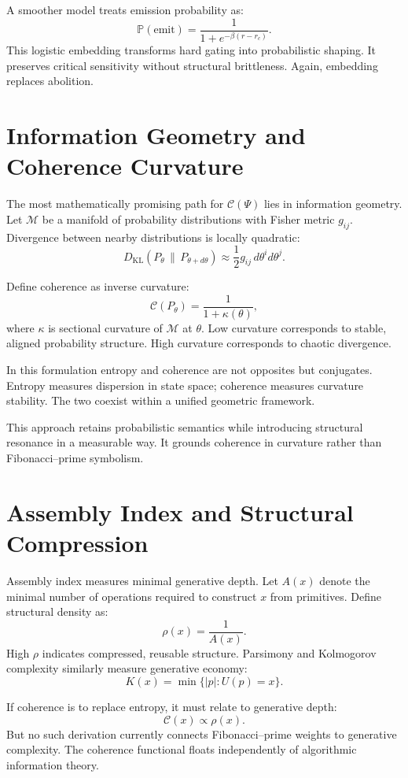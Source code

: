 \documentclass[12pt]{article}
\begin{document}
A smoother model treats emission probability as:
\[
  \mathbb{P}(\text{emit}) = \frac{1}{1 + e^{-\beta(r - r_c)}}.
\]
This logistic embedding transforms hard gating into probabilistic shaping. It preserves critical sensitivity without structural brittleness. Again, embedding replaces abolition.

\section{Information Geometry and Coherence Curvature}

The most mathematically promising path for $\mathcal{C}(\Psi)$ lies in information geometry. Let $\mathcal{M}$ be a manifold of probability distributions with Fisher metric $g_{ij}$. Divergence between nearby distributions is locally quadratic:
\[
  D_{\mathrm{KL}}(P_{\theta} \,\|\, P_{\theta + d\theta}) 
  \approx \frac{1}{2} g_{ij} \, d\theta^i d\theta^j.
\]

Define coherence as inverse curvature:
\[
  \mathcal{C}(P_\theta) = \frac{1}{1 + \kappa(\theta)},
\]
where $\kappa$ is sectional curvature of $\mathcal{M}$ at $\theta$. Low curvature corresponds to stable, aligned probability structure. High curvature corresponds to chaotic divergence.

In this formulation entropy and coherence are not opposites but conjugates. Entropy measures dispersion in state space; coherence measures curvature stability. The two coexist within a unified geometric framework.

This approach retains probabilistic semantics while introducing structural resonance in a measurable way. It grounds coherence in curvature rather than Fibonacci–prime symbolism.

\section{Assembly Index and Structural Compression}

Assembly index measures minimal generative depth. Let $A(x)$ denote the minimal number of operations required to construct $x$ from primitives. Define structural density as:
\[
  \rho(x) = \frac{1}{A(x)}.
\]
High $\rho$ indicates compressed, reusable structure. Parsimony and Kolmogorov complexity similarly measure generative economy:
\[
  K(x) = \min \{ |p| : U(p) = x \}.
\]

If coherence is to replace entropy, it must relate to generative depth:
\[
  \mathcal{C}(x) \propto \rho(x).
\]
But no such derivation currently connects Fibonacci–prime weights to generative complexity. The coherence functional floats independently of algorithmic information theory.
\end{document}
